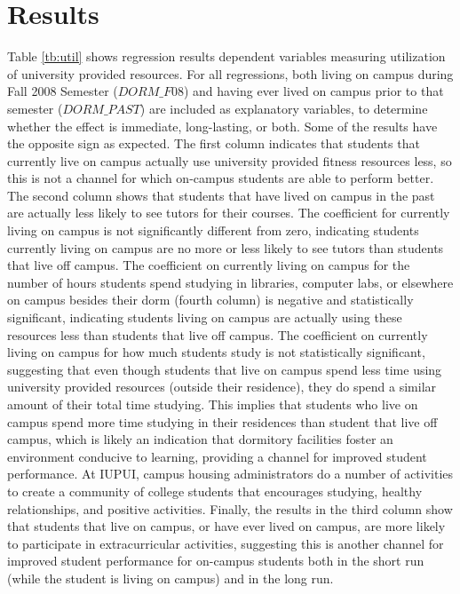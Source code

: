 \documentclass[10pt]{article}
\begin{document}
\section{Results}
Table \ref{tb:util} shows regression results dependent variables measuring utilization of university provided resources.  For all regressions, both living on campus during Fall 2008 Semester ($DORM\_F08$) and having ever lived on campus prior to that semester ($DORM\_PAST$) are included as explanatory variables, to determine whether the effect is immediate, long-lasting, or both.  Some of the results have the opposite sign as expected.  The first column indicates that students that currently live on campus actually use university provided fitness resources less, so this is not a channel for which on-campus students are able to perform better.  The second column shows that students that have lived on campus in the past are actually less likely to see tutors for their courses.  The coefficient for currently living on campus is not significantly different from zero, indicating students currently living on campus are no more or less likely to see tutors than students that live off campus.  The coefficient on currently living on campus for the number of hours students spend studying in libraries, computer labs, or elsewhere on campus besides their dorm (fourth column) is negative and statistically significant, indicating students living on campus are actually using these resources less than students that live off campus.  The coefficient on currently living on campus for how much students study is not statistically significant, suggesting that even though students that live on campus spend less time using university provided resources (outside their residence), they do spend a similar amount of their total time studying.  This implies that students who live on campus spend more time studying in their residences than student that live off campus, which is likely an indication that dormitory facilities foster an environment conducive to learning, providing a channel for improved student performance.  At IUPUI, campus housing administrators do a number of activities to create a community of college students that encourages studying, healthy relationships, and positive activities.  Finally, the results in the third column show that students that live on campus, or have ever lived on campus, are more likely to participate in extracurricular activities, suggesting this is another channel for improved student performance for on-campus students both in the short run (while the student is living on campus) and in the long run.
\end{document}
